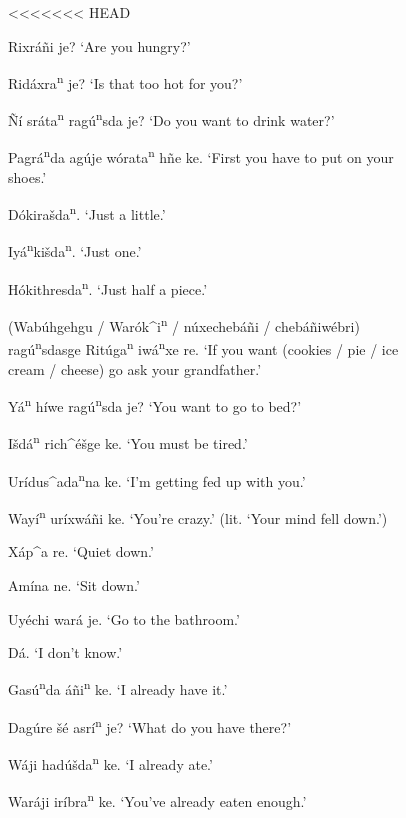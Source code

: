 \documentclass[output=paper]{LSP/langsci}
\begin{document}
\begin{figure}[p]
\begin{list}{}{} \itemsep1pt \parskip0pt 

<<<<<<< HEAD
\item{Rixráñi je? `Are you hungry?'}
\item{Ridáxra\textsuperscript{n} je? `Is that too hot for you?'}
\item{\~Ní sráta\textsuperscript{n} rag\'u\textsuperscript{n}sda je? `Do you want to drink water?'}
\item{Pagrá\textsuperscript{n}da ag\'uje wórata\textsuperscript{n} hñe ke. `First you have to put on your shoes.'}
\item{Dókira\v{s}da\textsuperscript{n}.	`Just a little.'}
\item{}
\item{Iyá\textsuperscript{n}ki\v{s}da\textsuperscript{n}. `Just one.'}
\item{Hókithre{s}da\textsuperscript{n}. `Just half a piece.'}
\item{(Wab\'uhgehgu / Warók\^{ }i\textsuperscript{n} / n\'uxechebáñi / chebáñiw\'ebri) rag\'u\textsuperscript{n}sdasge Rit\'uga\textsuperscript{n} iwá\textsuperscript{n}xe re. `If you want (cookies / pie / ice cream / cheese) go ask your grandfather.'}
\item{Yá\textsuperscript{n} híwe rag\'u\textsuperscript{n}sda je? `You want to go to bed?'}
\item{I\v{s}dá\textsuperscript{n} rich\^{ }\'e\v{s}ge ke. `You must be tired.'}
\item{}
\item{Urídus\^{ }ada\textsuperscript{n}na ke. `I'm getting fed up with you.'}
\item{Wayí\textsuperscript{n} uríxwáñi ke. `You're crazy.' (lit. `Your mind fell down.')}
\item{Xáp\^{ }a re. `Quiet down.'}
\item{Amína ne. `Sit down.'	}
\item{Uy\'echi wará je. `Go to the bathroom.'}
\item{}
\item{Dá.	`I don't know.'}
\item{Gas\'u\textsuperscript{n}da áñi\textsuperscript{n} ke.	`I already have it.'}
\item{Dag\'ure \v{s}\'e asrí\textsuperscript{n} je?	 `What do you have there?'}
\item{Wáji had\'u\v{s}da\textsuperscript{n} ke. `I already ate.'}
\item{Waráji iríbra\textsuperscript{n} ke. `You've already eaten enough.'}

\end{list}
\end{figure}
\end{document}
